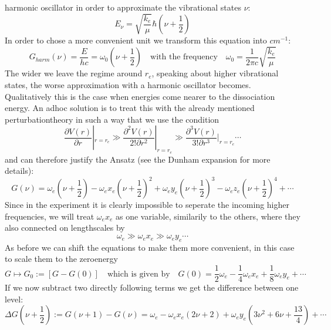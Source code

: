 harmonic oscillator in order to approximate
the vibrational states $\nu$:
\begin{equation}
    E_\nu =\sqrt{\frac{k_e}{\mu}}\hbar \left (\nu
        + \frac{1}{2}\right )
\end{equation}
In order to chose a more convenient unit we transform this
equation into $cm^{-1}$:
\begin{equation}
    G_{harm}(\nu) = \frac{E}{hc} = \omega_0 (\nu + \frac{1}{2})
    \quad \text{with the frequency} \quad
    \omega_0 = \frac{1}{2\pi c} \sqrt{\frac{k_e}{\mu}}
\end{equation}
The wider we leave the regime around $r_e$, speaking about 
higher vibrational states, the worse approximation with a harmonic
oscillator becomes. Qualitatively this is the case when energies
come nearer to the dissociation energy. An adhoc solution is 
to treat this with the already mentioned perturbationtheory in such
a way that we use the condition
\begin{equation}
    \frac{\partial V(r)}{\partial r}|_{r=r_e}        \gg
    \frac{\partial^2 V(r)}{2!\partial r^2}|_{r=r_e}  \gg
    \frac{\partial^3 V(r)}{3!\partial r^3}|_{r=r_e}  
    \cdots
\end{equation}
and can therefore justify the Ansatz (see the Dunham expansion
    for more details):
\begin{equation}
    G(\nu) = \omega_e (\nu + \frac{1}{2} ) 
    - \omega_e x_e (\nu + \frac{1}{2} ) ^2 
    + \omega_e y_e (\nu + \frac{1}{2} ) ^3 
    - \omega_e z_e (\nu + \frac{1}{2} ) ^4 
    + \cdots 
    \label{eqn:G(v)_taylor}
\end{equation}
Since in the experiment it is clearly impossible to seperate
the incoming higher frequencies, we will treat $\omega_e x_e$ as 
one variable, similarily to the others, where they also connected
on lengthscales by
\begin{equation}
    \omega_e \gg \omega_ex_e \gg \omega_e y_e \cdots 
\end{equation}
As before we can shift the equations to make them more convenient,
in this case to scale them to the zeroenergy
\begin{equation}
    G \mapsto G_0 := \left [G-G(0) \right ] 
        \quad \text{which is given by}
    \quad G(0)=\frac{1}{2}\omega_e - \frac{1}{4}\omega_e x_e 
    + \frac{1}{8} \omega_e y_e + \cdots 
\end{equation}
If we now subtract two directly following terms we get the 
difference between one level:
\begin{equation}
    \Delta G(\nu +\frac{1}{2}) := G(\nu +1 ) - G(\nu) 
    = \omega_e - \omega_e x_e \left (2\nu +2\right ) + \omega_e y_e 
    \left (3\nu^2+ 6\nu + \frac{13}{4} 
        \right) + \cdots 
\end{equation} 
